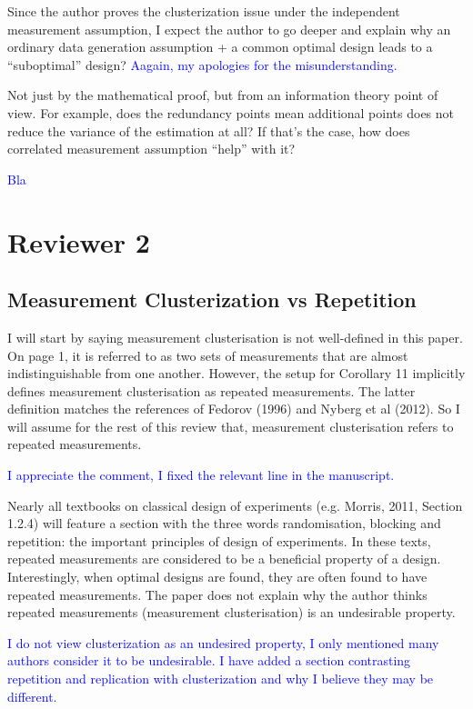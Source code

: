 \documentclass{amsart}
\newcommand{\answer}[1]{\vskip 0.05in \textcolor{blue}{#1} \vskip 0.05in}
\begin{document}
Since the author proves the clusterization issue under the independent
measurement assumption, I expect the author to go deeper and explain
why an ordinary data generation assumption + a common optimal design
leads to a “suboptimal” design?
\answer{Aagain, my apologies for the misunderstanding.}


Not just by the mathematical proof, but from an information theory
point of view. For example, does the redundancy points mean additional
points does not reduce the variance of the estimation at all? If
that’s the case, how does correlated measurement assumption “help”
with it?

\answer{Bla }

\section{Reviewer 2}
\subsection{Measurement Clusterization vs Repetition}
I will start by saying measurement clusterisation is not well-defined
in this paper. On page 1, it is referred to as two sets of
measurements that are almost indistinguishable from one
another. However, the setup for Corollary 11 implicitly defines
measurement clusterisation as repeated measurements. The latter
definition matches the references of Fedorov (1996) and Nyberg et al
(2012). So I will assume for the rest of this review that, measurement
clusterisation refers to repeated measurements.

\answer{I appreciate the comment, I fixed the relevant line in the
manuscript.}

Nearly all textbooks on classical design of experiments (e.g. Morris,
2011, Section 1.2.4) will feature a section with the three words
randomisation, blocking and repetition: the important principles of
design of experiments.  In these texts, repeated measurements are
considered to be a beneficial property of a design. Interestingly,
when optimal designs are found, they are often found to have repeated
measurements. The paper does not explain why the author thinks
repeated measurements (measurement clusterisation) is an undesirable
property.

\answer{I do not view clusterization as an undesired property, I only
mentioned many authors consider it to be undesirable. I have added a
section contrasting repetition and replication with clusterization and
why I believe they may be different. }
\end{document}
